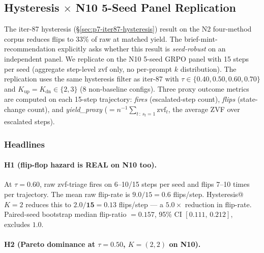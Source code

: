 \subsection{Hysteresis \texorpdfstring{$\times$}{x} N10 5-Seed Panel Replication}
\label{sec:p7-hysteresis-n10}

The iter-87 hysteresis (\S\ref{sec:p7-iter87-hysteresis}) result on the
N2 four-method corpus reduces flips to 33\% of raw at matched yield. The
brief-mint-recommendation explicitly asks whether this result is
\emph{seed-robust} on an independent panel. We replicate on the N10
5-seed GRPO panel with 15 steps per seed (aggregate step-level $\mathrm{zvf}$
only, no per-prompt $k$ distribution). The replication uses the same
hysteresis filter as iter-87 with $\tau \in \{0.40, 0.50, 0.60, 0.70\}$
and $K_\text{up} = K_\text{dn} \in \{2, 3\}$ (8 non-baseline configs).
Three proxy outcome metrics are computed on each 15-step trajectory:
\emph{fires} (escalated-step count), \emph{flips} (state-change count),
and \emph{yield\_proxy} ($= n^{-1} \sum_{t\,:\,s_t=1} \mathrm{zvf}_t$,
the average ZVF over escalated steps).

\subsubsection{Headlines}

\paragraph{H1 (flip-flop hazard is REAL on N10 too).}
At $\tau = 0.60$, raw zvf-triage fires on 6--10/15 steps per seed and flips
7--10 times per trajectory. The mean raw flip-rate is
$9.0/15 = 0.6$ flips/step. Hysteresis@$K{=}2$ reduces this to
$\mathbf{2.0/15 = 0.13}$ flips/step --- a $\mathbf{5.0\times}$ reduction
in flip-rate. Paired-seed bootstrap median flip-ratio $\mathbf{= 0.157}$,
95\% CI $[0.111,\, 0.212]$, excludes $1.0$.

\paragraph{H2 (Pareto dominance at $\tau = 0.50$, $K = (2,2)$ on N10).}


